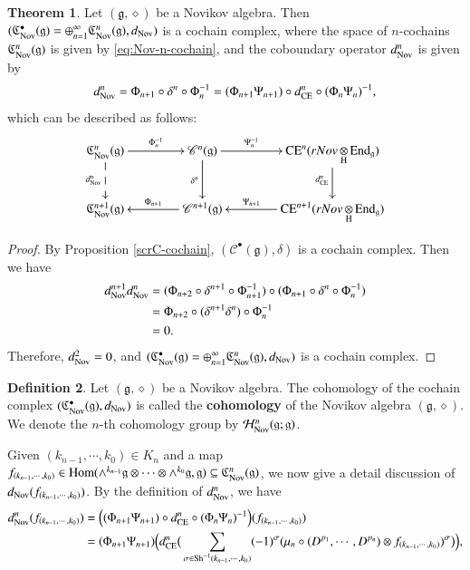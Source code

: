 \documentclass[12pt]{amsart}
\theoremstyle{definition}
\newtheorem{thm}{Theorem}[section]
\newtheorem{defi}[thm]{Definition}
\newcommand{\g}{\mathfrak g}
\newcommand{\huaH}{\mathcal{H}}
\newcommand{\frkC}{\mathfrak C}
\newcommand{\Hom}{\mathrm{Hom}}
\newcommand{\ot}{\otimes}
\newcommand{\Sh}{{\rm Sh}}
\newcommand{\ce}{{\rm CE}}
\newcommand{\scrC}{{\mathscr{C}}}
\newcommand{\nov}{{\rm Nov}}
\begin{document}
\begin{thm}\label{cochain-Nov}
Let $(\g,\diamond)$ be a Novikov algebra. Then $(\frkC_{\nov}^\bullet(\g)=\oplus_{n=1}^{\infty}\frkC_{\nov}^n(\g),d_{\nov})$ is a cochain complex, where the space of $n$-cochains $\frkC_{\nov}^n(\g)$ is given by \eqref{eq:Nov-n-cochain}, and the coboundary operator $d_\nov^n$ is given by
$$d^n_\nov=\Phi_{n+1}\circ \delta^n \circ\Phi_{n}^{-1}=(\Phi_{n+1}\Psi_{n+1})\circ d^n_\ce\circ (\Phi_{n}\Psi_{n})^{-1},$$
which can be described as follows:
	\[
	\xymatrix@C=4em{
		\frkC_{\nov}^n(\mathfrak{g})
		\ar[r]^-{\Phi_{n}^{-1}}
		\ar@{-->}[d]_{d^n_\nov}
		&
		\mathscr{C}^n(\mathfrak{g})
		\ar[r]^-{\Psi_{n}^{-1}}
		\ar[d]_{\delta^n}
		&
		\ce^n(rNov\mathop{\otimes}\limits_{\mathrm{H}}\mathrm{End}_{\mathfrak{g}})
		\ar[d]_{d_\ce^n}
		\\
		\frkC_{\nov}^{n+1}(\mathfrak{g})
		&
		\mathscr{C}^{n+1}(\mathfrak{g})
		\ar[l]_-{\Phi_{n+1}}
		&
		\ce^{n+1}(rNov\mathop{\otimes}\limits_{\rm H}\mathrm{End}_{\mathfrak{g}})
		\ar[l]_-{\Psi_{n+1}}
	}
	\]
\end{thm}
\begin{proof}
By Proposition \ref{scrC-cochain}, $(\scrC^\bullet(\g),\delta)$ is a cochain complex. Then we have
\begin{align*}
d_\nov^{n+1}d_\nov^n&=(\Phi_{n+2}\circ \delta^{n+1} \circ\Phi^{-1}_{n+1})\circ(\Phi_{n+1}\circ \delta^n \circ\Phi_{n}^{-1})\\
&=\Phi_{n+2}\circ(\delta^{n+1}\delta^n)\circ\Phi_{n}^{-1}\\
&=0.
\end{align*}
Therefore, $d_{\nov}^2=0$, and $(\frkC_{\nov}^\bullet(\g)=\oplus_{n=1}^{\infty}\frkC_{\nov}^n(\g),d_{\nov})$ is a cochain complex.
\end{proof}
\begin{defi}\label{def-cohomology-Nov}
Let $(\g,\diamond)$ be a Novikov algebra. The cohomology of the cochain complex $(\frkC_{\nov}^\bullet(\g),d_{\nov})$ is called the {\bf cohomology} of the Novikov algebra $(\g,\diamond)$. We denote the $n$-th cohomology group by $\huaH^n_\nov(\g;\g)$.
\end{defi}
Given $(k_{n-1},\cdots,k_0)\in K_n$ and a map $f_{(k_{n-1},\cdots,k_0)}\in\Hom(\wedge^{k_{n-1}}\g\ot\cdots\ot\wedge^{k_0}\g,\g)\subseteq\frkC_{\nov}^n(\g)$, we now give a detail discussion of $d_\nov(f_{(k_{n-1},\cdots,k_0)})$. By the definition of $d_\nov^n$, we have
\begin{align*}
d_\nov^n(f_{(k_{n-1},\cdots,k_0)})
&=\Big((\Phi_{n+1}\Psi_{n+1})\circ d^n_\ce\circ (\Phi_{n}\Psi_{n})^{-1}\Big)(f_{(k_{n-1},\cdots,k_0)})\\
&=(\Phi_{n+1}\Psi_{n+1})\Big(d_\ce^n\big(\sum_{\sigma\in\Sh^{-1}(k_{n-1},\cdots,k_0)} (-1)^\sigma (\mu_n\circ(D^{p_1},\cdots,D^{p_n})\otimes f_{(k_{n-1},\cdots,k_0)})^\sigma\big)\Big),
\end{align*}
\end{document}
